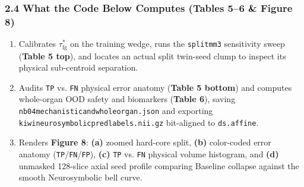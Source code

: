 \documentclass[10pt,a4paper]{article}
\renewcommand{\_}{\origunderscore\allowbreak}
\begin{document}
\subsubsection*{2.4 What the Code Below Computes (Tables 5--6 \& Figure 8)}
\begin{enumerate}
\item Calibrates $\tau_{\text{fg}}^*$ on the training wedge, runs the \texttt{split\_mm3} sensitivity sweep (\textbf{Table 5 top}), and locates an actual split twin-seed clump to inspect its physical sub-centroid separation.
\item Audits \texttt{TP} vs. \texttt{FN} physical error anatomy (\textbf{Table 5 bottom}) and computes whole-organ OOD safety and biomarkers (\textbf{Table 6}), saving \texttt{nb04\_mechanistic\_and\_whole\_organ.json} and exporting \texttt{kiwi\_neurosymbolic\_pred\_labels.nii.gz} bit-aligned to \texttt{ds.affine}.
\item Renders \textbf{Figure 8}: \textbf{(a)} zoomed hard-core split, \textbf{(b)} color-coded error anatomy (\texttt{TP}/\allowbreak{}\texttt{FN}/\allowbreak{}\texttt{FP}), \textbf{(c)} \texttt{TP} vs. \texttt{FN} physical volume histogram, and \textbf{(d)} unmasked 128-slice axial seed profile comparing Baseline collapse against the smooth Neurosymbolic bell curve.
\end{enumerate}
\end{document}
